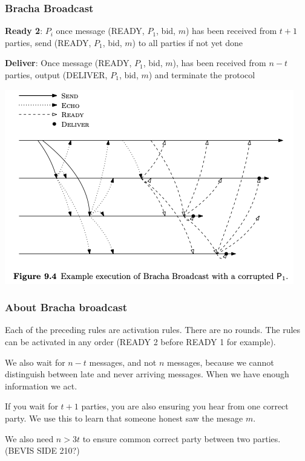     \begin{frame}
        \frametitle{Bracha Broadcast}
            \textbf{Ready 2}: $P_i$ once message (READY, $P_1$, bid, $m$) has been received from $t+1$ parties, send (READY, $P_1$, bid, $m$) to all parties if not yet done


            \textbf{Deliver}: Once message (READY, $P_1$, bid, $m$), has been received from $n-t$ parties, output (DELIVER, $P_1$, bid, $m$) and terminate the protocol
    \end{frame}
    \begin{frame}
        \includegraphics[width=\textwidth]{content/bracha.png}
    \end{frame}
    \begin{frame}
        \frametitle{About Bracha broadcast}
            Each of the preceding rules are activation rules. There are no rounds. The rules can be activated in any order (READY 2 before READY 1 for example). 
            
            We also wait for $n-t$ messages, and not $n$ messages, because we cannot distinguish between late and never arriving messages. When we have enough information we act. 

            If you wait for $t+1$ parties, you are also ensuring you hear from one correct party. We use this to learn that someone honest saw the  mesage $m$. 

            We also need $n > 3t$ to ensure common correct party between two parties. (BEVIS SIDE 210?)
    \end{frame}




